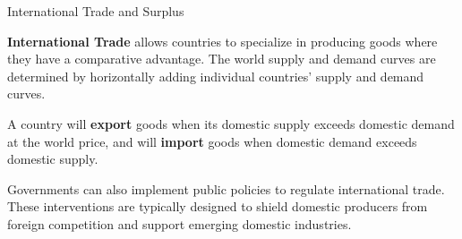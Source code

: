 \documentclass[10pt]{article}
\begin{document}
    \begin{core}{International Trade and Surplus}

      \textbf{International Trade} allows countries to specialize in producing goods where they have a comparative advantage. The world supply and demand curves are determined by horizontally adding individual countries' supply and demand curves.

      A country will \textbf{export} goods when its domestic supply exceeds domestic demand at the world price, and will \textbf{import} goods when domestic demand exceeds domestic supply.


      Governments can also implement public policies to regulate international trade. These interventions are typically designed to shield domestic producers from foreign competition and support emerging domestic industries.


\end{core}
\end{document}
